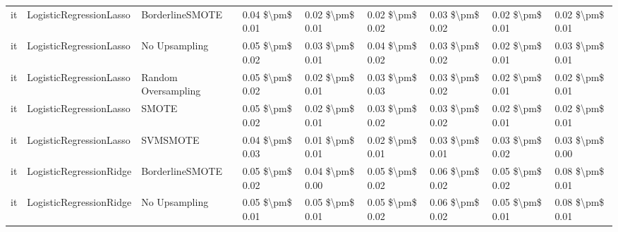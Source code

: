 \begin{tabular}{lllllllll}
      it &         LogisticRegressionLasso &               BorderlineSMOTE & 0.04 \$\textbackslash pm\$ 0.01 &           0.02 \$\textbackslash pm\$ 0.01 &       0.02 \$\textbackslash pm\$ 0.02 &        0.03 \$\textbackslash pm\$ 0.02 &                         0.02 \$\textbackslash pm\$ 0.01 &     0.02 \$\textbackslash pm\$ 0.01 \\
      it &         LogisticRegressionLasso &                 No Upsampling & 0.05 \$\textbackslash pm\$ 0.02 &           0.03 \$\textbackslash pm\$ 0.01 &       0.04 \$\textbackslash pm\$ 0.02 &        0.03 \$\textbackslash pm\$ 0.02 &                         0.02 \$\textbackslash pm\$ 0.01 &     0.03 \$\textbackslash pm\$ 0.01 \\
      it &         LogisticRegressionLasso &           Random Oversampling & 0.05 \$\textbackslash pm\$ 0.02 &           0.02 \$\textbackslash pm\$ 0.01 &       0.03 \$\textbackslash pm\$ 0.03 &        0.03 \$\textbackslash pm\$ 0.02 &                         0.02 \$\textbackslash pm\$ 0.01 &     0.02 \$\textbackslash pm\$ 0.01 \\
      it &         LogisticRegressionLasso &                         SMOTE & 0.05 \$\textbackslash pm\$ 0.02 &           0.02 \$\textbackslash pm\$ 0.01 &       0.03 \$\textbackslash pm\$ 0.02 &        0.03 \$\textbackslash pm\$ 0.02 &                         0.02 \$\textbackslash pm\$ 0.01 &     0.02 \$\textbackslash pm\$ 0.01 \\
      it &         LogisticRegressionLasso &                      SVMSMOTE & 0.04 \$\textbackslash pm\$ 0.03 &           0.01 \$\textbackslash pm\$ 0.01 &       0.02 \$\textbackslash pm\$ 0.01 &        0.03 \$\textbackslash pm\$ 0.01 &                         0.03 \$\textbackslash pm\$ 0.02 &     0.03 \$\textbackslash pm\$ 0.00 \\
      it &         LogisticRegressionRidge &               BorderlineSMOTE & 0.05 \$\textbackslash pm\$ 0.02 &           0.04 \$\textbackslash pm\$ 0.00 &       0.05 \$\textbackslash pm\$ 0.02 &        0.06 \$\textbackslash pm\$ 0.02 &                         0.05 \$\textbackslash pm\$ 0.02 &     0.08 \$\textbackslash pm\$ 0.01 \\
      it &         LogisticRegressionRidge &                 No Upsampling & 0.05 \$\textbackslash pm\$ 0.01 &           0.05 \$\textbackslash pm\$ 0.01 &       0.05 \$\textbackslash pm\$ 0.02 &        0.06 \$\textbackslash pm\$ 0.02 &                         0.05 \$\textbackslash pm\$ 0.01 &     0.08 \$\textbackslash pm\$ 0.01 \\

\end{tabular}
